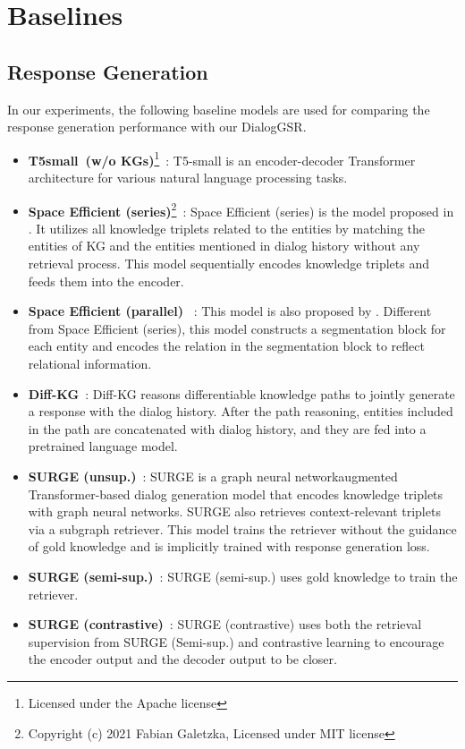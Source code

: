 

\section{Baselines}
\label{supp:baselines}
\subsection{Response Generation}
In our experiments, the following baseline models are used for comparing the response generation performance with our DialogGSR.

\begin{itemize}
    \item \textbf{T5{\textendash}small~(w/o KGs)}\footnote{Licensed under the Apache license}~\cite{roberts2019exploring}: T5-small is an encoder-decoder Transformer architecture for various natural language processing tasks.
    \item \textbf{Space Efficient (series)}\footnote{Copyright (c) 2021 Fabian Galetzka, Licensed under MIT license}~\cite{galetzka2021space}: Space Efficient (series) is the model proposed in \cite{galetzka2021space}. It utilizes all knowledge triplets related to the entities by matching the entities of KG and the entities mentioned in dialog history without any retrieval process.
    This model sequentially encodes knowledge triplets and feeds them into the encoder.
    \item \textbf{Space Efficient (parallel)}~\cite{galetzka2021space} : This model is also proposed by \cite{galetzka2021space}. Different from Space Efficient (series), this model constructs a segmentation block for each entity and encodes the relation in the segmentation block to reflect relational information.
    \item \textbf{Diff-KG}~\cite{tuan2022towards}: Diff-KG reasons differentiable knowledge paths to jointly generate a response with the dialog history.
    After the path reasoning, entities included in the path are concatenated with dialog history, and they are fed into a pretrained language model. 
    \item \textbf{SURGE (unsup.)}~\cite{kang2022knowledge}: SURGE is a graph neural network{\textendash}augmented Transformer-based dialog generation model that encodes knowledge triplets with graph neural networks.
    SURGE also retrieves context-relevant triplets via a subgraph retriever.
    This model trains the retriever without the guidance of gold knowledge and is implicitly trained with response generation loss.
    \item \textbf{SURGE (semi-sup.)}~\cite{kang2022knowledge}: SURGE (semi-sup.) uses gold knowledge to train the retriever. 
    \item \textbf{SURGE (contrastive)}~\cite{kang2022knowledge}: SURGE (contrastive) uses both the retrieval supervision from SURGE (Semi-sup.) and contrastive learning to encourage the encoder output and the decoder output to be closer.
\end{itemize}
